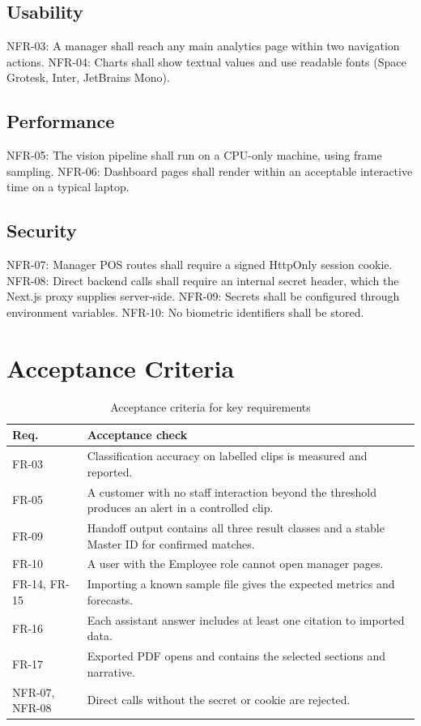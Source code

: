 \subsection{Usability}
NFR-03: A manager shall reach any main analytics page within two navigation actions. NFR-04: Charts shall show textual values and use readable fonts (Space Grotesk, Inter, JetBrains Mono).
\subsection{Performance}
NFR-05: The vision pipeline shall run on a CPU-only machine, using frame sampling. NFR-06: Dashboard pages shall render within an acceptable interactive time on a typical laptop. 
\subsection{Security}
NFR-07: Manager POS routes shall require a signed HttpOnly session cookie. NFR-08: Direct backend calls shall require an internal secret header, which the Next.js proxy supplies server-side. NFR-09: Secrets shall be configured through environment variables. NFR-10: No biometric identifiers shall be stored.

\section{Acceptance Criteria}
\begin{table}[H]
\centering
\caption{Acceptance criteria for key requirements}
\begin{tabular}{P{0.12\textwidth}P{0.75\textwidth}}
\toprule
Req. & Acceptance check\\
\midrule
FR-03 & Classification accuracy on labelled clips is measured and reported. \\
FR-05 & A customer with no staff interaction beyond the threshold produces an alert in a controlled clip.\\
FR-09 & Handoff output contains all three result classes and a stable Master ID for confirmed matches.\\
FR-10 & A user with the Employee role cannot open manager pages.\\
FR-14, FR-15 & Importing a known sample file gives the expected metrics and forecasts.\\
FR-16 & Each assistant answer includes at least one citation to imported data.\\
FR-17 & Exported PDF opens and contains the selected sections and narrative.\\
NFR-07, NFR-08 & Direct calls without the secret or cookie are rejected.\\
\bottomrule
\end{tabular}
\end{table}

